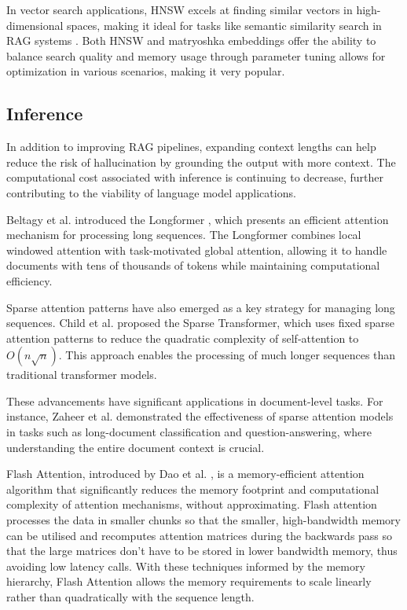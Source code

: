\documentclass[a4paper, oneside]{discothesis}
\begin{document}
In vector search applications, HNSW excels at finding similar vectors in high-dimensional spaces, making it ideal for tasks like semantic similarity search in RAG systems \cite{johnson2017billion}. Both HNSW and matryoshka embeddings offer the ability to balance search quality and memory usage through parameter tuning allows for optimization in various scenarios, making it very popular. 

\subsection{Inference}
In addition to improving RAG pipelines, expanding context lengths can help reduce the risk of hallucination by grounding the output with more context. The computational cost associated with inference is continuing to decrease, further contributing to the viability of language model applications. 

Beltagy et al. introduced the Longformer \cite{beltagy2020longformer}, which presents an efficient attention mechanism for processing long sequences. The Longformer combines local windowed attention with task-motivated global attention, allowing it to handle documents with tens of thousands of tokens while maintaining computational efficiency.

Sparse attention patterns have also emerged as a key strategy for managing long sequences. Child et al. \cite{child2019generating} proposed the Sparse Transformer, which uses fixed sparse attention patterns to reduce the quadratic complexity of self-attention to $O(n\sqrt{n})$. This approach enables the processing of much longer sequences than traditional transformer models.

These advancements have significant applications in document-level tasks. For instance, Zaheer et al. \cite{zaheer2021big} demonstrated the effectiveness of sparse attention models in tasks such as long-document classification and question-answering, where understanding the entire document context is crucial.

Flash Attention, introduced by Dao et al. \cite{dao2023flashattention2fasterattentionbetter}, is a memory-efficient attention algorithm that significantly reduces the memory footprint and computational complexity of attention mechanisms, without approximating. Flash attention processes the data in smaller chunks so that the smaller, high-bandwidth memory can be utilised and recomputes attention matrices during the backwards pass so that the large matrices don't have to be stored in lower bandwidth memory, thus avoiding low latency calls. With these techniques informed by the memory hierarchy, Flash Attention allows the memory requirements to scale linearly rather than quadratically with the sequence length. 
\end{document}
